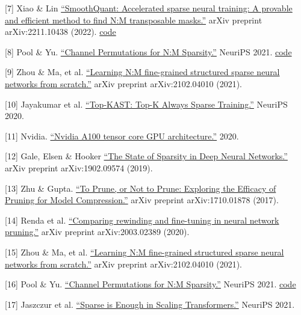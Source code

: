 {[}7{]} Xiao \& Lin \href{https://arxiv.org/abs/2211.10438}{``SmoothQuant: Accelerated sparse neural training: A provable and efficient method to find N:M transposable masks.''} arXiv preprint arXiv:2211.10438 (2022). \textbar{} \href{https://github.com/mit-han-lab/smoothquant}{code}

{[}8{]} Pool \& Yu. \href{https://proceedings.neurips.cc/paper/2021/hash/6e8404c3b93a9527c8db241a1846599a-Abstract.html}{``Channel Permutations for N:M Sparsity.''} NeuriPS 2021. \textbar{} \href{https://github.com/NVIDIA/apex/tree/master/apex/contrib/sparsity}{code}

{[}9{]} Zhou \& Ma, et al. \href{https://arxiv.org/abs/2102.04010}{``Learning N:M fine-grained structured sparse neural networks from scratch.''} arXiv preprint arXiv:2102.04010 (2021).

{[}10{]} Jayakumar et al. \href{https://arxiv.org/abs/2106.03517}{``Top-KAST: Top-K Always Sparse Training.''} NeuriPS 2020.

{[}11{]} Nvidia. \href{https://images.nvidia.com/aem-dam/en-zz/Solutions/data-center/nvidia-ampere-architecture-whitepaper.pdf}{``Nvidia A100 tensor core GPU architecture.''} 2020.

{[}12{]} Gale, Elsen \& Hooker \href{https://arxiv.org/abs/1902.09574}{``The State of Sparsity in Deep Neural Networks.''} arXiv preprint arXiv:1902.09574 (2019).

{[}13{]} Zhu \& Gupta. \href{https://arxiv.org/abs/1710.01878}{``To Prune, or Not to Prune: Exploring the Efficacy of Pruning for Model Compression.''} arXiv preprint arXiv:1710.01878 (2017).

{[}14{]} Renda et al. \href{https://arxiv.org/abs/2003.02389}{``Comparing rewinding and fine-tuning in neural network pruning.''} arXiv preprint arXiv:2003.02389 (2020).

{[}15{]} Zhou \& Ma, et al. \href{https://arxiv.org/abs/2102.04010}{``Learning N:M fine-grained structured sparse neural networks from scratch.''} arXiv preprint arXiv:2102.04010 (2021).

{[}16{]} Pool \& Yu. \href{https://proceedings.neurips.cc/paper/2021/hash/6e8404c3b93a9527c8db241a1846599a-Abstract.html}{``Channel Permutations for N:M Sparsity.''} NeuriPS 2021. \textbar{} \href{https://github.com/NVIDIA/apex/tree/master/apex/contrib/sparsity}{code}

{[}17{]} Jaszczur et al. \href{https://arxiv.org/abs/2111.12763}{``Sparse is Enough in Scaling Transformers.''} NeuriPS 2021.

